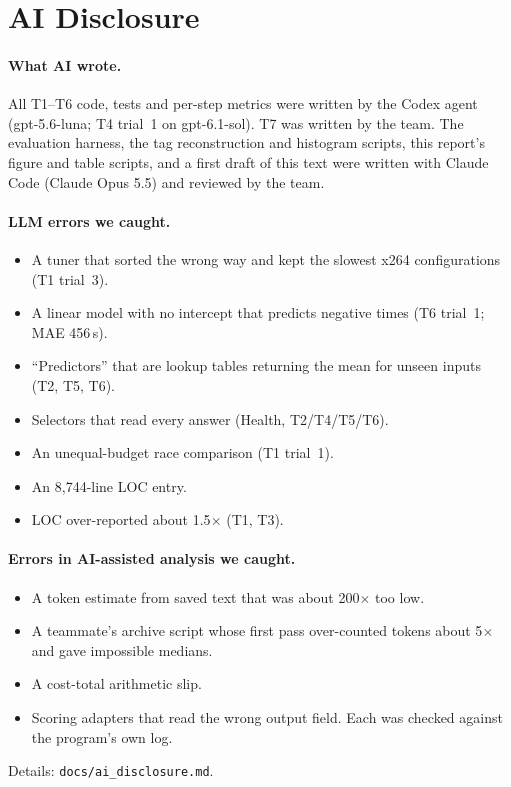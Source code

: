 \documentclass[acmsmall,nonacm]{acmart}
\begin{document}
\section*{AI Disclosure}
\paragraph{What AI wrote.} All T1--T6 code, tests and per-step metrics were written by the Codex agent (gpt-5.6-luna; T4 trial~1 on gpt-6.1-sol). T7 was written by the team.
The evaluation harness, the tag reconstruction and histogram scripts, this report's figure and table scripts, and a first draft of this text were written with Claude Code (Claude Opus 5.5) and reviewed by the team.

\paragraph{LLM errors we caught.}
\begin{itemize}
\item A tuner that sorted the wrong way and kept the slowest x264 configurations (T1 trial~3).
\item A linear model with no intercept that predicts negative times (T6 trial~1; MAE 456\,s).
\item ``Predictors'' that are lookup tables returning the mean for unseen inputs (T2, T5, T6).
\item Selectors that read every answer (Health, T2/T4/T5/T6).
\item An unequal-budget race comparison (T1 trial~1).
\item An 8,744-line LOC entry.
\item LOC over-reported about 1.5$\times$ (T1, T3).
\end{itemize}

\paragraph{Errors in AI-assisted analysis we caught.}
\begin{itemize}
\item A token estimate from saved text that was about 200$\times$ too low.
\item A teammate's archive script whose first pass over-counted tokens about 5$\times$ and gave impossible medians.
\item A cost-total arithmetic slip.
\item Scoring adapters that read the wrong output field. Each was checked against the program's own log.
\end{itemize}
Details: \texttt{docs/ai\_disclosure.md}.



\end{document}

